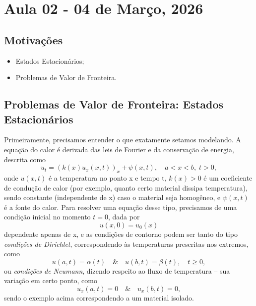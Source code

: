 \documentclass[../differential_methods.tex]{subfiles}
\begin{document}
\section{Aula 02 - 04 de Março, 2026}
\subsection{Motivações}
\begin{itemize}
	\item Estados Estacionários;
	\item Problemas de Valor de Fronteira.
\end{itemize}
\subsection{Problemas de Valor de Fronteira: Estados Estacionários}
Primeiramente, precisamos entender o que exatamente setamos modelando. A equação do calor é derivada das leis de Fourier e da conservação de energia, descrita como
\[
	u_{t} = (k(x)u_{x}(x, t))_{x} + \psi (x, t), \quad a <x <b,\; t >0,
\]
onde \(u(x, t)\) é a temperatura no ponto x e tempo t, \(k(x)>0\) é um coeficiente de condução de calor (por exemplo, quanto certo material dissipa temperatura), sendo constante (independente de x) caso o material seja homogêneo, e \(\psi (x, t)\) é a fonte do calor.
Para resolver uma equação desse tipo, precisamos de uma condição inicial no momento \(t=0\), dada por
\[
	u(x, 0)=u_{0}(x)
\]
dependente apenas de x, e as condições de contorno podem ser tanto do tipo \textit{condições de Dirichlet}, correspondendo às temperaturas prescritas nos extremos, como
\[
	u(a, t)=\alpha (t) \quad\&\quad u(b, t)=\beta (t),\quad t\geq 0,
\]
ou \textit{condições de Neumann}, dizendo respeito ao fluxo de temperatura -- sua variação em certo ponto, como
\[
	u_{x}(a, t) = 0 \quad\&\quad u_{x}(b, t)=0,
\]
sendo o exemplo acima correspondendo a um material isolado.
\end{document}
